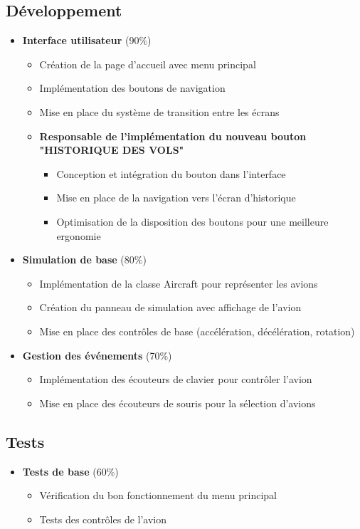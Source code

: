 \documentclass[12pt,a4paper]{article}
\begin{document}
\subsection{Développement}
\begin{itemize}
    \item \textbf{Interface utilisateur} (90\%)
    \begin{itemize}
        \item Création de la page d'accueil avec menu principal
        \item Implémentation des boutons de navigation
        \item Mise en place du système de transition entre les écrans
        \item \textbf{Responsable de l'implémentation du nouveau bouton "HISTORIQUE DES VOLS"}
        \begin{itemize}
            \item Conception et intégration du bouton dans l'interface
            \item Mise en place de la navigation vers l'écran d'historique
            \item Optimisation de la disposition des boutons pour une meilleure ergonomie
        \end{itemize}
    \end{itemize}
    
    \item \textbf{Simulation de base} (80\%)
    \begin{itemize}
        \item Implémentation de la classe Aircraft pour représenter les avions
        \item Création du panneau de simulation avec affichage de l'avion
        \item Mise en place des contrôles de base (accélération, décélération, rotation)
    \end{itemize}
    
    \item \textbf{Gestion des événements} (70\%)
    \begin{itemize}
        \item Implémentation des écouteurs de clavier pour contrôler l'avion
        \item Mise en place des écouteurs de souris pour la sélection d'avions
    \end{itemize}
\end{itemize}

\subsection{Tests}
\begin{itemize}
    \item \textbf{Tests de base} (60\%)
    \begin{itemize}
        \item Vérification du bon fonctionnement du menu principal
        \item Tests des contrôles de l'avion
    \end{itemize}
\end{itemize}
\end{document}
